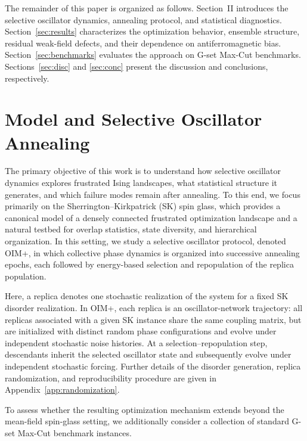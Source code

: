 \documentclass[
reprint,
amsmath,amssymb,
aps,
pre,
floatfix,
]{revtex4-2}
\begin{document}
{The remainder of this paper is organized as follows.
Section~II introduces the selective oscillator dynamics, annealing protocol,
and statistical diagnostics. Section~\ref{sec:results} characterizes the optimization
behavior, ensemble structure, residual weak-field defects, and their
dependence on antiferromagnetic bias. Section~\ref{sec:benchmarks} evaluates the approach on
G-set Max-Cut benchmarks. Sections~\ref{sec:disc} and \ref{sec:conc} present the discussion and
conclusions, respectively.}


\section{Model and Selective Oscillator Annealing}
\label{sec:model}

The primary objective of this work is to understand how selective oscillator
dynamics explores frustrated Ising landscapes, what statistical structure it
generates, and which failure modes remain after annealing. To this end, we
focus primarily on the Sherrington--Kirkpatrick (SK) spin glass, which
provides a canonical model of a densely connected frustrated optimization
landscape and a natural testbed for overlap statistics, state diversity, and
hierarchical organization. In this setting, we study a selective oscillator
protocol, denoted OIM+, in which collective phase dynamics is organized into
successive annealing epochs, each followed by energy-based selection and
repopulation of the replica population.


Here, a replica denotes one stochastic realization of the system for a fixed
SK disorder realization. In OIM+, each replica is an oscillator-network
trajectory: all replicas associated with a given SK instance share the same
coupling matrix, but are initialized with distinct random phase configurations
and evolve under independent stochastic noise histories. At a selection--repopulation step, descendants inherit the selected
oscillator state and subsequently evolve under independent stochastic forcing.
Further details of the disorder generation, replica randomization, and
reproducibility procedure are given in Appendix~\ref{app:randomization}.

To assess whether the resulting optimization mechanism extends beyond the
mean-field spin-glass setting, we additionally consider a collection of
standard G-set Max-Cut benchmark instances.
\end{document}
